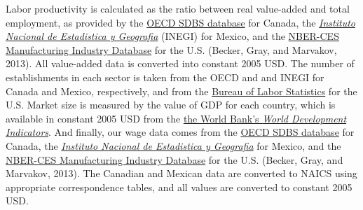 Labor productivity is calculated as the ratio between real value-added and total 
employment, as provided by the \href{http://stats.oecd.org/index.aspx?queryid=224}{OECD SDBS database} 
for Canada, the \href{http://buscador.inegi.org.mx/search?q=encuesta+industrial+anual&client=ProductosR&proxystylesheet=ProductosR&num=10&getfields=*&sort=meta:edicion:D:E:::D&entsp=a__inegi_politica_p72&lr=lang_es\%7Clang_en&oe=UTF-8&ie=UTF-8&ip=10.210.100.253&entqr=3&filter=0&site=ProductosBuscador&tlen=260&ulang=en&start=0}{\emph{Instituto Nacional de Estadistica y Geografia}} 
(INEGI) for Mexico, and the \href{http://www.nber.org/nberces/}{NBER-CES Manufacturing Industry Database}
 for the U.S. (Becker, Gray, and Marvakov, 2013). All value-added data is 
converted into constant 2005 USD. The number of establishments in each sector is 
taken from the OECD and and INEGI for Canada and Mexico, respectively, and from 
the \href{http://www.bls.gov/cew/doc/titles/ownership/ownership_titles.htm}{Bureau of Labor Statistics} 
for the U.S. Market size is measured by the value of GDP for each country, which 
is available in constant 2005 USD from the \href{http://data.worldbank.org/data-catalog/world-development-indicators}{the World Bank's \emph{World Development Indicators}}.
 And finally, our wage data comes from the \href{http://stats.oecd.org/index.aspx?queryid=224}{OECD SDBS database} 
for Canada, the \href{http://buscador.inegi.org.mx/search?q=encuesta+industrial+anual&client=ProductosR&proxystylesheet=ProductosR&num=10&getfields=*&sort=meta:edicion:D:E:::D&entsp=a__inegi_politica_p72&lr=lang_es\%7Clang_en&oe=UTF-8&ie=UTF-8&ip=10.210.100.253&entqr=3&filter=0&site=ProductosBuscador&tlen=260&ulang=en&start=0}{\emph{Instituto Nacional de Estadistica y Geografia}} for Mexico, and the \href{http://www.nber.org/nberces/}{NBER-CES Manufacturing Industry Database} for the U.S. (Becker, Gray, and Marvakov, 2013). The Canadian and Mexican data are converted to NAICS using appropriate correspondence tables, and all values are converted to constant 2005 USD. 

